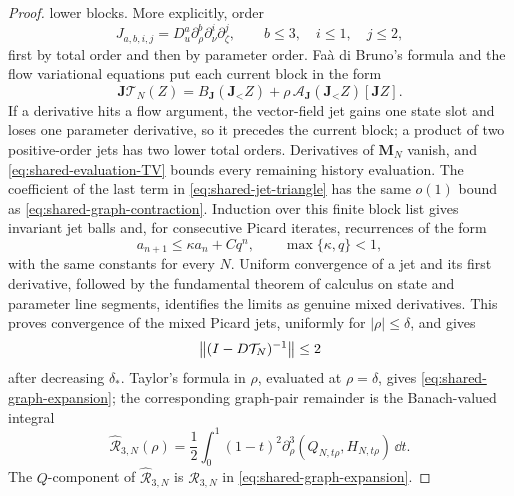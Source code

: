 \begin{proof}
lower blocks.  More explicitly, order
\[
 J_{a,b,i,j}=D_u^a\partial_\rho^b\partial_\nu^i
                 \partial_\zeta^j,\qquad
 b\le3,\quad i\le1,\quad j\le2,
\]
first by total order and then by parameter order.  Fa\`a di Bruno's formula
and the flow variational equations put each current block in the form
\begin{equation}
 \mathbf J\mathcal T_N(Z)
 =B_{\mathbf J}(\mathbf J_{<}Z)
 +\rho\,\mathcal A_{\mathbf J}(\mathbf J_{<}Z)
          [\mathbf JZ].                               \label{eq:shared-jet-triangle}
\end{equation}
If a derivative hits a flow argument, the vector-field jet gains one state
slot and loses one parameter derivative, so it precedes the current block;
a product of two positive-order jets has two lower total orders.  Derivatives
of \(\mathbf M_N\) vanish, and
\cref{eq:shared-evaluation-TV} bounds every remaining history evaluation.
The coefficient of the last term in
\cref{eq:shared-jet-triangle} has the same \(o(1)\) bound as
\cref{eq:shared-graph-contraction}.  Induction over this finite block list
gives invariant jet balls and, for consecutive Picard iterates, recurrences
of the form
\[
 a_{n+1}\le\kappa a_n+Cq^n,\qquad \max\{\kappa,q\}<1,
\]
with the same constants for every \(N\).  Uniform convergence of a jet and
its first derivative, followed by the fundamental theorem of calculus on
state and parameter line segments, identifies the limits as genuine mixed
derivatives.  This proves convergence of the mixed Picard jets, uniformly
for \(|\rho|\le\delta\), and gives
\begin{equation}
 \left\lVert(I-D\mathcal T_N)^{-1}\right\rVert\le2                   \label{eq:shared-graph-range}
\end{equation}
after decreasing \(\delta_*\).  Taylor's formula in \(\rho\), evaluated at
\(\rho=\delta\), gives
\cref{eq:shared-graph-expansion}; the corresponding graph-pair remainder is
the Banach-valued integral
\[
 \widehat{\mathcal R}_{3,N}(\rho)
 =\frac12\int_0^1(1-t)^2
       \partial_\rho^3(Q_{N,t\rho},H_{N,t\rho})\,\dd t.
\]
The \(Q\)-component of \(\widehat{\mathcal R}_{3,N}\) is
\(\mathcal R_{3,N}\) in \cref{eq:shared-graph-expansion}.


\end{proof}
